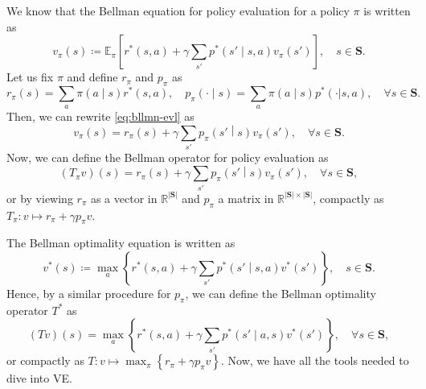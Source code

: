 \documentclass[a4paper]{article}
\theoremstyle{definition}
\theoremstyle{remark}
\theoremstyle{plain}
\newcommand{\bS}{\mathbf{S}}
\newcommand{\R}{\mathbb{R}}
\newcommand{\E}{\mathbb{E}}
\begin{document}
We know that the Bellman equation for policy evaluation for a policy $\pi$ is written as 
\begin{equation}
    \label{eq:bllmn-evl}
    v_\pi(s) \coloneq \E_\pi \left[r^*(s, a) + \gamma \sum_{s'} p^*\left(s' \middle\vert s, a\right) v_\pi\left(s'\right)\right], \quad s \in \bS.
\end{equation}
Let us fix $\pi$ and define $r_\pi$ and $p_\pi$ as
%
\begin{equation*}
    r_\pi(s) = \sum_a \pi(a \mid s)r^*(s, a), \quad  p_\pi(\cdot \mid s) = \sum_a \pi(a \mid s) p^*(\cdot |s, a), \quad \forall s \in \bS.
\end{equation*}
Then, we can rewrite \cref{eq:bllmn-evl} as
%
\begin{equation*}
    v_\pi(s) = r_\pi(s) + \gamma \sum_{s'}p_\pi\left(s' \middle\vert s\right)v_\pi\left(s'\right), \quad \forall s \in \bS.
\end{equation*}
Now, we can define the Bellman operator for policy evaluation as
\begin{equation*}
    \left(T_\pi v\right)(s) = r_\pi(s) + \gamma \sum_{s'}p_\pi\left(s' \middle\vert s\right) v_\pi\left(s'\right), \quad \forall s \in \bS,
\end{equation*}
or by viewing $r_\pi$ as a vector in $\R^{|\bS|}$ and $p_\pi$ a matrix in $\R^{|\bS| \times |\bS|}$, compactly as $T_\pi: v \mapsto r_\pi + \gamma  p_\pi v$.
%

The Bellman optimality equation is written as 
\begin{equation}
    \label{eq:bllmn-evl}
    v^*(s) \coloneq \max_a \left\{r^*(s, a) + \gamma \sum_{s'} p^*\left(s' \middle\vert s, a\right) v^*\left(s'\right)\right\}, \quad s \in \bS.
\end{equation}
Hence, by a similar procedure for $p_\pi$, we can define the Bellman optimality operator $T^*$ as 
\begin{equation*}
    \left(T v\right)(s) = \max_a \left\{ r^*(s, a) + \gamma \sum_{s'} p^*\left(s' \middle\vert a, s\right) v^*\left(s'\right) \right\}, \quad \forall s \in \bS,
\end{equation*}
or compactly as $T: v \mapsto \max_\pi \left\{r_\pi + \gamma  p_\pi v \right\}$. Now, we have all the tools needed to dive into VE. 
\end{document}
